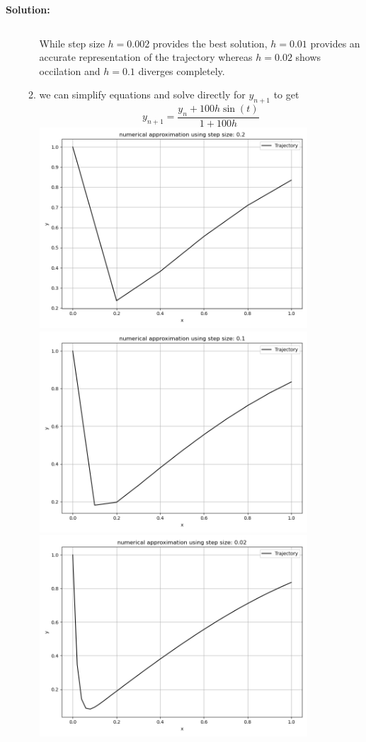 \documentclass[a4paper,12pt]{scrartcl} %
\newenvironment{solution}
  {\par\color{answercolor}\textbf{Solution:}\ }
  {\par}
\theoremstyle{darktheorem}
\begin{document}
\begin{solution}
\begin{enumerate}
\begin{enumerate}
\begin{lstlisting}
            \end{lstlisting}
            While step size $h = 0.002$ provides the best solution, $h=0.01$ provides an accurate representation of the trajectory
            whereas $h=0.02$ shows occilation and $h=0.1$ diverges completely.
        \item 
            we can simplify equations and solve directly for $y_{n+1}$ to get
             \[
                 y_{n+1} = \frac{y_n + 100 h \sin(t)}{1 + 100h}
             \]
            \includegraphics[width = 10cm]{BE_STEP0.2.png}\\
            \includegraphics[width = 10cm]{BE_STEP0.1.png}\\
            \includegraphics[width = 10cm]{BE_STEP0.02.png}\\

\end{enumerate}
\end{enumerate}
\end{solution}
\end{document}
